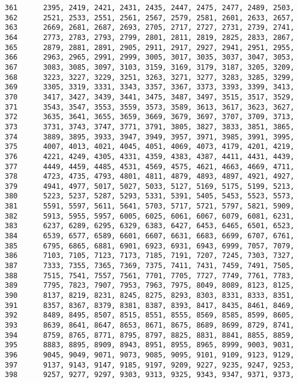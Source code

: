\begin{Code}
\begin{verbatim}
361      2395, 2419, 2421, 2431, 2435, 2447, 2475, 2477, 2489, 2503, 
362      2521, 2533, 2551, 2561, 2567, 2579, 2581, 2601, 2633, 2657,
363      2669, 2681, 2687, 2693, 2705, 2717, 2727, 2731, 2739, 2741,
364      2773, 2783, 2793, 2799, 2801, 2811, 2819, 2825, 2833, 2867,
365      2879, 2881, 2891, 2905, 2911, 2917, 2927, 2941, 2951, 2955,
366      2963, 2965, 2991, 2999, 3005, 3017, 3035, 3037, 3047, 3053,
367      3083, 3085, 3097, 3103, 3159, 3169, 3179, 3187, 3205, 3209,
368      3223, 3227, 3229, 3251, 3263, 3271, 3277, 3283, 3285, 3299,
369      3305, 3319, 3331, 3343, 3357, 3367, 3373, 3393, 3399, 3413,
370      3417, 3427, 3439, 3441, 3475, 3487, 3497, 3515, 3517, 3529,
371      3543, 3547, 3553, 3559, 3573, 3589, 3613, 3617, 3623, 3627,
372      3635, 3641, 3655, 3659, 3669, 3679, 3697, 3707, 3709, 3713,
373      3731, 3743, 3747, 3771, 3791, 3805, 3827, 3833, 3851, 3865,
374      3889, 3895, 3933, 3947, 3949, 3957, 3971, 3985, 3991, 3995,
375      4007, 4013, 4021, 4045, 4051, 4069, 4073, 4179, 4201, 4219,
376      4221, 4249, 4305, 4331, 4359, 4383, 4387, 4411, 4431, 4439,
377      4449, 4459, 4485, 4531, 4569, 4575, 4621, 4663, 4669, 4711,
378      4723, 4735, 4793, 4801, 4811, 4879, 4893, 4897, 4921, 4927,
379      4941, 4977, 5017, 5027, 5033, 5127, 5169, 5175, 5199, 5213,
380      5223, 5237, 5287, 5293, 5331, 5391, 5405, 5453, 5523, 5573,
381      5591, 5597, 5611, 5641, 5703, 5717, 5721, 5797, 5821, 5909,
382      5913, 5955, 5957, 6005, 6025, 6061, 6067, 6079, 6081, 6231,
383      6237, 6289, 6295, 6329, 6383, 6427, 6453, 6465, 6501, 6523,
384      6539, 6577, 6589, 6601, 6607, 6631, 6683, 6699, 6707, 6761,
385      6795, 6865, 6881, 6901, 6923, 6931, 6943, 6999, 7057, 7079,
386      7103, 7105, 7123, 7173, 7185, 7191, 7207, 7245, 7303, 7327, 
387      7333, 7355, 7365, 7369, 7375, 7411, 7431, 7459, 7491, 7505, 
388      7515, 7541, 7557, 7561, 7701, 7705, 7727, 7749, 7761, 7783,
389      7795, 7823, 7907, 7953, 7963, 7975, 8049, 8089, 8123, 8125,
390      8137, 8219, 8231, 8245, 8275, 8293, 8303, 8331, 8333, 8351,
391      8357, 8367, 8379, 8381, 8387, 8393, 8417, 8435, 8461, 8469,
392      8489, 8495, 8507, 8515, 8551, 8555, 8569, 8585, 8599, 8605,
393      8639, 8641, 8647, 8653, 8671, 8675, 8689, 8699, 8729, 8741,
394      8759, 8765, 8771, 8795, 8797, 8825, 8831, 8841, 8855, 8859,
395      8883, 8895, 8909, 8943, 8951, 8955, 8965, 8999, 9003, 9031,
396      9045, 9049, 9071, 9073, 9085, 9095, 9101, 9109, 9123, 9129,
397      9137, 9143, 9147, 9185, 9197, 9209, 9227, 9235, 9247, 9253,
398      9257, 9277, 9297, 9303, 9313, 9325, 9343, 9347, 9371, 9373,

\end{verbatim}
\end{Code}
